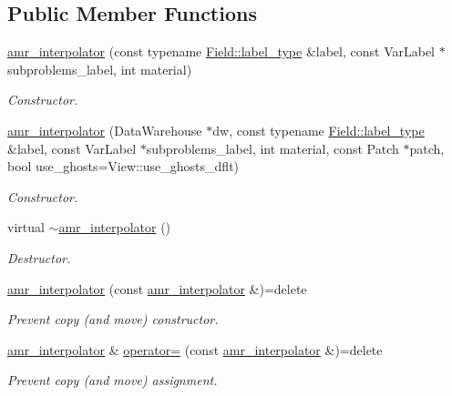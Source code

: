 \subsection*{Public Member Functions}
\begin{DoxyCompactItemize}
\item 
\hyperlink{classUintah_1_1PhaseField_1_1detail_1_1amr__interpolator_3_01VectorField_3_01T_00_01N_01_4_00_01ab3739ebd28e1ffb5bc0b138cfaddd80_affa96f42d4c838acc9a94dd0c5fc4d33}{amr\+\_\+interpolator} (const typename \hyperlink{structUintah_1_1PhaseField_1_1VectorField_a59698346336d8cdfdf767367839f2be9}{Field\+::label\+\_\+type} \&label, const Var\+Label $\ast$subproblems\+\_\+label, int material)
\begin{DoxyCompactList}\small\item\em Constructor. \end{DoxyCompactList}\item 
\hyperlink{classUintah_1_1PhaseField_1_1detail_1_1amr__interpolator_3_01VectorField_3_01T_00_01N_01_4_00_01ab3739ebd28e1ffb5bc0b138cfaddd80_ab5cb32ce1a86a80d7b16ba06b42a2e1d}{amr\+\_\+interpolator} (Data\+Warehouse $\ast$dw, const typename \hyperlink{structUintah_1_1PhaseField_1_1VectorField_a59698346336d8cdfdf767367839f2be9}{Field\+::label\+\_\+type} \&label, const Var\+Label $\ast$subproblems\+\_\+label, int material, const Patch $\ast$patch, bool use\+\_\+ghosts=View\+::use\+\_\+ghosts\+\_\+dflt)
\begin{DoxyCompactList}\small\item\em Constructor. \end{DoxyCompactList}\item 
virtual \hyperlink{classUintah_1_1PhaseField_1_1detail_1_1amr__interpolator_3_01VectorField_3_01T_00_01N_01_4_00_01ab3739ebd28e1ffb5bc0b138cfaddd80_afbe7bb3efbb058c4396e8e549b3cbcef}{$\sim$amr\+\_\+interpolator} ()
\begin{DoxyCompactList}\small\item\em Destructor. \end{DoxyCompactList}\item 
\hyperlink{classUintah_1_1PhaseField_1_1detail_1_1amr__interpolator_3_01VectorField_3_01T_00_01N_01_4_00_01ab3739ebd28e1ffb5bc0b138cfaddd80_a1f75287ee5fc8828e84fa530fb779e47}{amr\+\_\+interpolator} (const \hyperlink{classUintah_1_1PhaseField_1_1detail_1_1amr__interpolator}{amr\+\_\+interpolator} \&)=delete
\begin{DoxyCompactList}\small\item\em Prevent copy (and move) constructor. \end{DoxyCompactList}\item 
\hyperlink{classUintah_1_1PhaseField_1_1detail_1_1amr__interpolator}{amr\+\_\+interpolator} \& \hyperlink{classUintah_1_1PhaseField_1_1detail_1_1amr__interpolator_3_01VectorField_3_01T_00_01N_01_4_00_01ab3739ebd28e1ffb5bc0b138cfaddd80_aadd32c026392c0a152d1704b0ae69bd1}{operator=} (const \hyperlink{classUintah_1_1PhaseField_1_1detail_1_1amr__interpolator}{amr\+\_\+interpolator} \&)=delete
\begin{DoxyCompactList}\small\item\em Prevent copy (and move) assignment. \end{DoxyCompactList}\end{DoxyCompactItemize}
